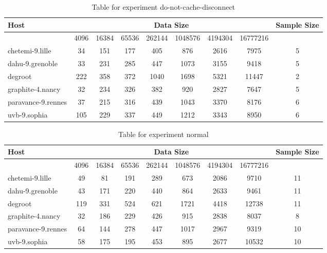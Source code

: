 \begin{table}
\caption{Table for experiment do-not-cache-disconnect}
\begin{tabular}{@{}lcccccccc@{}}
\toprule
Host    & \multicolumn{7}{c}{Data Size}          & Sample Size \\ \midrule
& 4096  & 16384  & 65536  & 262144  & 1048576  & 4194304  & 16777216              \\ \midrule
chetemi-9.lille  & 34  & 151  & 177  & 405  & 876  & 2616  & 7975  & 5 \\
dahu-9.grenoble  & 33  & 231  & 285  & 447  & 1073  & 3155  & 9418  & 5 \\
degroot  & 222  & 358  & 372  & 1040  & 1698  & 5321  & 11447  & 2 \\
graphite-4.nancy  & 32  & 234  & 326  & 382  & 920  & 2827  & 7647  & 5 \\
paravance-9.rennes  & 37  & 215  & 316  & 439  & 1043  & 3370  & 8176  & 6 \\
uvb-9.sophia  & 105  & 229  & 337  & 449  & 1212  & 3343  & 8950  & 6 \\
\bottomrule
\end{tabular}
\end{table}

\begin{table}
\caption{Table for experiment normal}
\begin{tabular}{@{}lcccccccc@{}}
\toprule
Host    & \multicolumn{7}{c}{Data Size}          & Sample Size \\ \midrule
& 4096  & 16384  & 65536  & 262144  & 1048576  & 4194304  & 16777216              \\ \midrule
chetemi-9.lille  & 49  & 81  & 191  & 289  & 673  & 2086  & 9710  & 11 \\
dahu-9.grenoble  & 43  & 171  & 220  & 440  & 864  & 2633  & 9461  & 11 \\
degroot  & 119  & 331  & 524  & 621  & 1721  & 4418  & 12738  & 11 \\
graphite-4.nancy  & 32  & 186  & 229  & 426  & 915  & 2838  & 8037  & 8 \\
paravance-9.rennes  & 64  & 144  & 278  & 447  & 1017  & 2967  & 9319  & 10 \\
uvb-9.sophia  & 58  & 175  & 195  & 453  & 895  & 2677  & 10532  & 10 \\
\bottomrule
\end{tabular}
\end{table}



